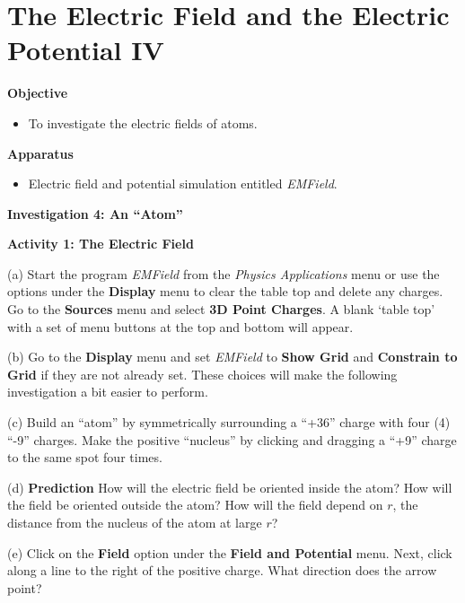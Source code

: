 
\section{The Electric Field and the Electric Potential IV}

\makelabheader %

\textbf{Objective}

\begin{itemize}
\item To investigate the electric fields of atoms.
\end{itemize}

\textbf{Apparatus}

\begin{itemize}
\item Electric field and potential simulation entitled {\it EMField}.
\end{itemize}

\textbf{Investigation 4: An {}``Atom''}

\textbf{Activity 1: The Electric Field}

(a) Start the program {\it EMField} from the {\it Physics Applications} menu or use the options under the 
\textbf{Display} menu to clear the table top and delete any charges.
Go to the \textbf{Sources} menu and select \textbf{3D Point Charges}.
A blank `table top' with a set of menu 
buttons at the top and bottom will appear.

(b) Go to the {\bf Display} menu and set {\it EMField} to
{\bf Show Grid} and {\bf Constrain to Grid} if they are not already set.
These choices will make the following investigation a bit easier to perform.

(c) Build an {}``atom'' by symmetrically surrounding
a {}``+36'' charge with four (4) {}``-9'' charges.
Make the positive ``nucleus'' by clicking and dragging a ``+9'' charge
to the same spot four times.


(d) {\bf Prediction} How will the electric field be oriented inside the atom?
How will the field be oriented outside the atom?
How will the field depend on $r$, the distance from the nucleus of the atom
at large $r$?
\vspace{25mm}

(e) Click on the \textbf{Field} option under the \textbf{Field and Potential} menu.
Next, click along a line to the right of the positive charge.
What direction does the arrow point?
\vspace{15mm}

